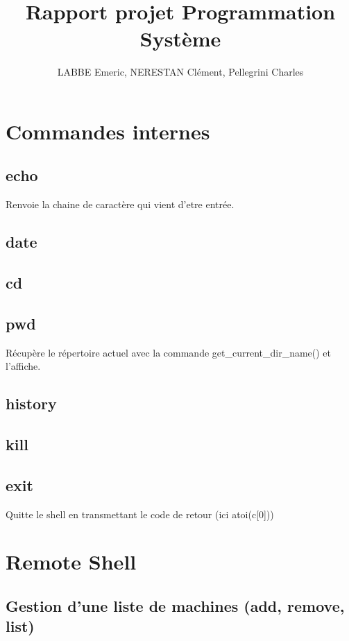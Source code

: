 \documentclass[12pt]{article}
\author{LABBE Emeric, NERESTAN Clément, Pellegrini Charles}
\title{Rapport projet Programmation Système}
\begin{document}
\maketitle
\tableofcontents

\newpage
\section{Commandes internes}

\subsection{echo}
Renvoie la chaine de caractère qui vient d'etre entrée.

\subsection{date}

\subsection{cd}

\subsection{pwd}
Récupère le répertoire actuel avec la commande get\_current\_dir\_name() et l'affiche.

\subsection{history}

\subsection{kill}

\subsection{exit}
Quitte le shell en transmettant le code de retour (ici atoi(c[0]))

\newpage
\section{Remote Shell}
\subsection{Gestion d'une liste de machines (add, remove, list)}
\end{document}
